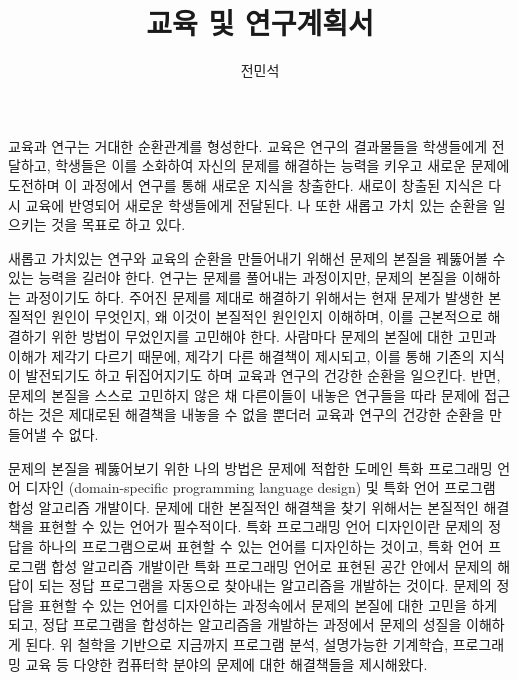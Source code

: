 \documentclass[11pt]{article}
\begin{document}
\title{교육 및 연구계획서}

\author{전민석}



\newcommand{\DisjunctiveModel}{\textsc{Disjunctive Model}}
\newcommand{\FeatureLanguage}{\textsc{Feature Language}}
\newcommand{\GDL}{\textsc{Graph Description Language}}
\newcommand{\PLXGL}{\textsc{PL4XGL}}


\newcommand{\AbstractRelativeWritePattern}{\textsc{Abstract Relative Write Pattern}}





\maketitle 
\begin{spacing}{1.145}

교육과 연구는 거대한 순환관계를 형성한다. 
%
교육은 연구의 결과물들을 학생들에게 전달하고, 학생들은 이를 소화하여 자신의 문제를 해결하는 능력을 키우고 새로운 문제에 도전하며 이 과정에서 연구를 통해 새로운 지식을 창출한다. 새로이 창출된 지식은 다시 교육에 반영되어 새로운 학생들에게 전달된다.
%
나 또한 새롭고 가치 있는 순환을 일으키는 것을 목표로 하고 있다.



새롭고 가치있는 연구와 교육의 순환을 만들어내기 위해선 문제의 본질을 꿰뚫어볼 수 있는 능력을 길러야 한다.
%
연구는 문제를 풀어내는 과정이지만, 문제의 본질을 이해하는 과정이기도 하다. 
%
주어진 문제를 제대로 해결하기 위해서는 현재 문제가 발생한 본질적인 원인이 무엇인지, 왜 이것이 본질적인 원인인지 이해하며, 이를 근본적으로 해결하기 위한 방법이 무었인지를 고민해야 한다.
%
사람마다 문제의 본질에 대한 고민과 이해가 제각기 다르기 때문에, 제각기 다른 해결책이 제시되고, 이를 통해 기존의 지식이 발전되기도 하고 뒤집어지기도 하며 교육과 연구의 건강한 순환을 일으킨다.
%
반면, 문제의 본질을 스스로 고민하지 않은 채 다른이들이 내놓은 연구들을 따라 문제에 접근하는 것은 제대로된 해결책을 내놓을 수 없을 뿐더러 교육과 연구의 건강한 순환을 만들어낼 수 없다.



문제의 본질을 꿰뚫어보기 위한 나의 방법은 문제에 적합한 도메인 특화 프로그래밍 언어 디자인 (domain-specific programming language design) 및 특화 언어 프로그램 합성 알고리즘 개발이다.
% 
문제에 대한 본질적인 해결책을 찾기 위해서는 본질적인 해결책을 표현할 수 있는 언어가 필수적이다.
% 
특화 프로그래밍 언어 디자인이란 문제의 정답을 하나의 프로그램으로써 표현할 수 있는 언어를 디자인하는 것이고, 특화 언어 프로그램 합성 알고리즘 개발이란 특화 프로그래밍 언어로 표현된 공간 안에서 문제의 해답이 되는 정답 프로그램을 자동으로 찾아내는 알고리즘을 개발하는 것이다.
% 
문제의 정답을 표현할 수 있는 언어를 디자인하는 과정속에서 문제의 본질에 대한 고민을 하게 되고, 정답 프로그램을 합성하는 알고리즘을 개발하는 과정에서 문제의 성질을 이해하게 된다.
%
위 철학을 기반으로 지금까지 프로그램 분석, 설명가능한 기계학습, 프로그래밍 교육 등 다양한 컴퓨터학 분야의 문제에 대한 해결책들을 제시해왔다.
%





\end{spacing}
\end{document}

